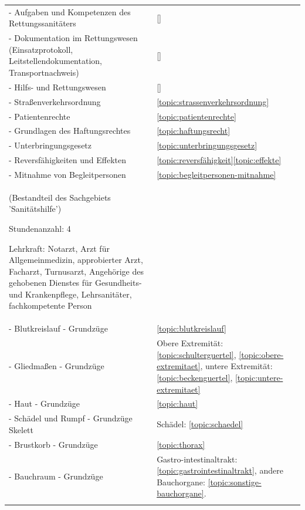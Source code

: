 \begin{xtabular}{p{10cm}p{5cm}}
- Aufgaben und Kompetenzen des  Rettungssanitäters       
& 
\ref{}\noindent{}
\\
- Dokumentation im Rettungswesen (Einsatzprotokoll, Leitstellendokumentation, Transportnachweis)
& 
\ref{}\noindent{}
\\
- Hilfs- und Rettungswesen
& 
\ref{}\noindent{}
\\
- Straßenverkehrsordnung
& 
\noindent\ref{topic:strassenverkehrsordnung}
\\
- Patientenrechte
& 
\noindent\ref{topic:patientenrechte}
\\
- Grundlagen des Haftungsrechtes
& 
\noindent\ref{topic:haftungsrecht}
\\
- Unterbringungsgesetz
& 
\noindent\ref{topic:unterbringungsgesetz}
\\
- Reversfähigkeiten und Effekten
& 
\noindent\ref{topic:reversfähigkeit}\ref{topic:effekte}
\\
- Mitnahme von Begleitpersonen
& 
\noindent\ref{topic:begleitpersonen-mitnahme}
\\\toprule
{}  

(Bestandteil des Sachgebiets 'Sanitätshilfe')  

\begin{inparadesc}
\item[Stundenanzahl:] 4
\item[Lehrkraft:]  Notarzt, Arzt für Allgemeinmedizin, approbierter Arzt,
Facharzt, Turnusarzt,   Angehörige  des  gehobenen  Dienstes für Gesundheits- 
und Krankenpflege, Lehrsanitäter, fachkompetente Person
\end{inparadesc}

\\\midrule

- Blutkreislauf - Grundzüge               
& 
\ref{topic:blutkreislauf}
\\
- Gliedmaßen - Grundzüge  
& 
Obere Extremität: \ref{topic:schulterguertel}, \ref{topic:obere-extremitaet},
untere Extremität: \ref{topic:beckenguertel}, 
\ref{topic:untere-extremitaet}
\\
- Haut - Grundzüge        
& 
\ref{topic:haut}
\\
- Schädel und Rumpf - Grundzüge Skelett       
& 
Schädel: \ref{topic:schaedel}
\\
- Brustkorb - Grundzüge   
& 
\ref{topic:thorax}
\\
- Bauchraum - Grundzüge   
& 
Gastro-intestinaltrakt: \ref{topic:gastrointestinaltrakt}, andere Bauchorgane:
\ref{topic:sonstige-bauchorgane}. 
\\\toprule
{}  


\end{xtabular}
